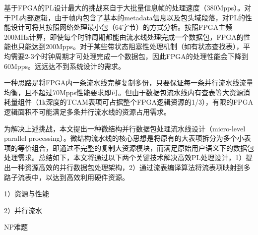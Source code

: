 基于FPGA的PL设计最大的挑战来自于大批量信息帧的处理速度（380Mpps）。对于PL内部逻辑，由于帧内包含了基本的metadata信息以及包头域段落，对PL的性能设计可将其按照网络处理最小包（64字节）的方式分析。按照FPGA主频200MHz计算，即使每个时钟周期都能由流水线处理完成一个数据包，FPGA的性能也只能达到200Mpps。对于某些带状态阻塞性处理机制（如有状态查找表），平均需要2-3个时钟周期才可处理完成一个数据包，因此FPGA的处理性能会下降到60Mpps。远远达不到系统设计的需求。

一种思路是将FPGA内一条流水线完整复制多份，只要保证每一条并行流水线流量均衡，且不超过70Mpps性能要求即可。但由于数据包流水线内有查表等大资源消耗量组件（1k深度的TCAM表项可占据整个FPGA逻辑资源的1/3），有限的FPGA逻辑面积不可能满足多条并行流水线的资源占用需求。

为解决上述挑战，本文提出一种微结构并行数据包处理流水线设计（micro-level parallel processing）。微结构流水线的核心思想是将原有的大表项拆分为多个小表项的等价组合，即通过不完整的复制大资源模块，而满足原始用户语义下的数据包处理需求。总结如下，本文将通过以下两个关键技术解决高效PL处理设计，1）提出一种资源高效的并行数据包处理架构，2）通过流表编译算法将流表项映射到多路子流表中，以达到高效利用硬件资源。

1）资源与性能

2）并行流水

%
%


NP难题












